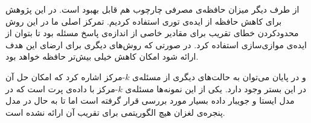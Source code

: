از طرف دیگر میزان حافظه‌ی مصرفی چارچوب هم قابل بهبود است. در این پژوهش برای کاهش حافظه از ایده‌ی توری استفاده کردیم. تمرکز اصلی ما در این روش محدودکردن خطای تقریب برای مقادیر خاصی از اندازه‌ی پاسخ مسئله بود تا بتوان از ایده‌ی موازی‌سازی استفاده کرد. در صورتی که روش‌های دیگری برای ارضای این هدف ارائه شود امکان کاهش خیلی بیش‌تر حافظه خواهد بود.

و در پایان می‌توان به حالت‌های دیگری از مسئله‌ی $k$-مرکز اشاره کرد که امکان حل آن در این بستر وجود دارد. یکی از این نمونه‌ها مسئله‌ی $k$-مرکز با داده‌ی پرت است که در مدل ایستا و جویبار داده بسیار مورد بررسی قرار گرفته است اما تا به حال در مدل پنجره‌ی لغزان هیچ الگوریتمی برای تقریب آن ارائه نشده است.


